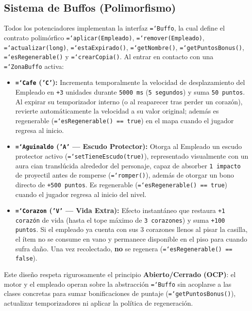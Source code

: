 \documentclass[12pt, a4paper]{article}
\DeclareRobustCommand{\code}[1]{\textcolor{codegreen}{\texttt{\hyphenchar\font=`\-#1}}}
\begin{document}
\subsection{Sistema de Buffos (Polimorfismo)}
Todos los potenciadores implementan la interfaz \code{Buffo}, la cual define el contrato polimórfico \code{aplicar(Empleado)}, \code{remover(Empleado)}, \code{actualizar(long)}, \code{estaExpirado()}, \code{getNombre()}, \code{getPuntosBonus()}, \code{esRegenerable()} y \code{crearCopia()}. Al entrar en contacto con una \code{ZonaBuffo} activa:
\begin{itemize}[leftmargin=1.27cm]
    \item \textbf{\code{Cafe} (\texttt{'C'}):} Incrementa temporalmente la velocidad de desplazamiento del Empleado en \texttt{+3} unidades durante \texttt{5000 ms} (\texttt{5 segundos}) y suma \texttt{50 puntos}. Al expirar su temporizador interno (o al reaparecer tras perder un corazón), revierte automáticamente la velocidad a su valor original; además es regenerable (\code{esRegenerable() == true}) en el mapa cuando el jugador regresa al inicio.
    \item \textbf{\code{Aguinaldo} (\texttt{'A'} — Escudo Protector):} Otorga al Empleado un escudo protector activo (\code{setTieneEscudo(true)}), representado visualmente con un aura cian translúcida alrededor del personaje, capaz de absorber \texttt{1 impacto} de proyectil antes de romperse (\code{romper()}), además de otorgar un bono directo de \texttt{+500 puntos}. Es regenerable (\code{esRegenerable() == true}) cuando el jugador regresa al inicio del nivel.
    \item \textbf{\code{Corazon} (\texttt{'V'} — Vida Extra):} Efecto instantáneo que restaura \texttt{+1 corazón} de vida (hasta el tope máximo de \texttt{3 corazones}) y suma \texttt{+100 puntos}. Si el empleado ya cuenta con sus 3 corazones llenos al pisar la casilla, el ítem no se consume en vano y permanece disponible en el piso para cuando sufra daño. Una vez recolectado, \textbf{no} se regenera (\code{esRegenerable() == false}).
\end{itemize}

Este diseño respeta rigurosamente el principio \textbf{Abierto/Cerrado (OCP)}: el motor y el empleado operan sobre la abstracción \code{Buffo} sin acoplarse a las clases concretas para sumar bonificaciones de puntaje (\code{getPuntosBonus()}), actualizar temporizadores ni aplicar la política de regeneración.
\end{document}
